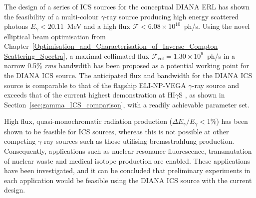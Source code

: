 \documentclass[../main.tex]{subfiles}
\begin{document}
The design of a series of ICS sources for the conceptual DIANA ERL has shown the feasibility of a multi-colour $\gamma$-ray source producing high energy scattered photons $E_{\gamma}<20.11$~\si{\mega\electronvolt} and a high flux $\mathcal{F}<6.08\times 10^{10}$~ph/\si{\second}. Using the novel elliptical beam optimisation from Chapter~\ref{Optimisation_and_Characterisation_of_Inverse_Compton Scattering_Spectra}, a maximal collimated flux $\mathcal{F}_{\mathrm{col}}=1.30\times 10^{9}$~ph/\si{\second} in a narrow 0.5\% \textit{rms} bandwdith has been proposed as a potential working point for the DIANA ICS source. The anticipated flux and bandwidth for the DIANA ICS source is comparable to that of the flagship ELI-NP-VEGA \cite{elinp2019vega,tanaka2020current} $\gamma$-ray source and exceeds that of the current highest demonstration at HI$\gamma$S \cite{weller2009research}, as shown in Section~\ref{sec:gamma_ICS_comparison}, with a readily achievable parameter set.

High flux, quasi-monochromatic radiation production ($\Delta E_{\gamma}/E_{\gamma} < 1$\%) has been shown to be feasible for ICS sources, whereas this is not possible at other competing $\gamma$-ray sources such as those utilising bremsstrahlung production. Consequently, applications such as nuclear resonance fluorescence, transmutation of nuclear waste and medical isotope production are enabled. These applications have been investigated, and it can be concluded that preliminary experiments in each application would be feasible using the DIANA ICS source with the current design.
\end{document}
